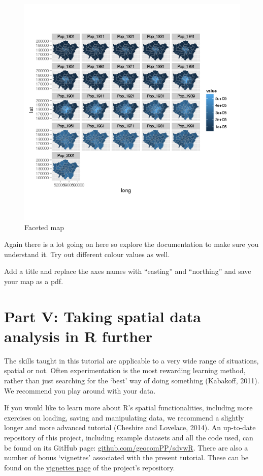 \documentclass[]{article}
\begin{document}
\begin{figure}[htbp]
\centering
\includegraphics{figure/Faceted_map.png}
\caption{Faceted map}
\end{figure}

Again there is a lot going on here so explore the documentation to make
sure you understand it. Try out different colour values as well.

Add a title and replace the axes names with ``easting'' and ``northing''
and save your map as a pdf.

\section{Part V: Taking spatial data analysis in R
further}\label{part-v-taking-spatial-data-analysis-in-r-further}

The skills taught in this tutorial are applicable to a very wide range
of situations, spatial or not. Often experimentation is the most
rewarding learning method, rather than just searching for the `best' way
of doing something (Kabakoff, 2011). We recommend you play around with
your data.

If you would like to learn more about R's spatial functionalities,
including more exercises on loading, saving and manipulating data, we
recommend a slightly longer and more advanced tutorial (Cheshire and
Lovelace, 2014). An up-to-date repository of this project, including
example datasets and all the code used, can be found on its GitHub page:
\href{https://github.com/geocomPP/sdvwR}{github.com/geocomPP/sdvwR}.
There are also a number of bonus `vignettes' associated with the present
tutorial. These can be found on the
\href{https://github.com/Robinlovelace/Creating-maps-in-R/tree/master/vignettes}{vignettes
page} of the project's repository.
\end{document}
